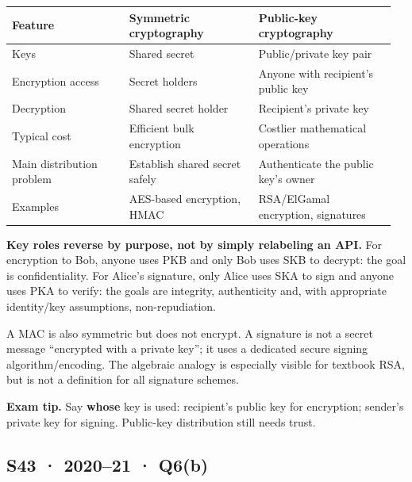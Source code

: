 \documentclass[11pt,a4paper]{article}
\begin{document}
{\small\setlength{\tabcolsep}{3pt}
\begin{longtable}{>{\raggedright\arraybackslash}p{0.29232\linewidth}>{\raggedright\arraybackslash}p{0.32022\linewidth}>{\raggedright\arraybackslash}p{0.34588\linewidth}}
\toprule
\textbf{Feature} & \textbf{Symmetric cryptography} & \textbf{Public-key cryptography} \\
\midrule
\endhead
Keys & Shared secret & Public/\allowbreak{}private key pair \\
Encryption access & Secret holders & Anyone with recipient’s public key \\
Decryption & Shared secret holder & Recipient’s private key \\
Typical cost & Efficient bulk encryption & Costlier mathematical operations \\
Main distribution problem & Establish shared secret safely & Authenticate the public key’s owner \\
Examples & AES-based encryption,\allowbreak{} HMAC & RSA/\allowbreak{}ElGamal encryption,\allowbreak{} signatures \\
\bottomrule
\end{longtable}
}

\textbf{Key roles reverse by purpose,\allowbreak{} not by simply relabeling an API.} For encryption to Bob,\allowbreak{} anyone uses PKB and only Bob uses SKB to decrypt: the goal is confidentiality. For Alice’s signature,\allowbreak{} only Alice uses SKA to sign and anyone uses PKA to verify: the goals are integrity,\allowbreak{} authenticity and,\allowbreak{} with appropriate identity/\allowbreak{}key assumptions,\allowbreak{} non-repudiation.


A MAC is also symmetric but does not encrypt. A signature is not a secret message “encrypted with a private key”; it uses a dedicated secure signing algorithm/\allowbreak{}encoding. The algebraic analogy is especially visible for textbook RSA,\allowbreak{} but is not a definition for all signature schemes.



{\color{ForestGreen}\textbf{Exam tip.} Say \textbf{whose} key is used: recipient’s public key for encryption; sender’s private key for signing. Public-key distribution still needs trust.}




\clearpage
\subsection{S43 · 2020–21 · Q6(b)}\label{s43}
\end{document}
